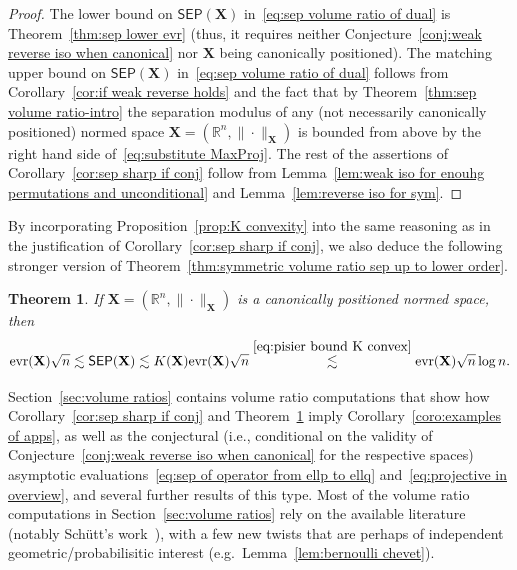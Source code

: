 \documentclass[11pt,reqno]{amsart}
\newcommand{\evr}{\mathrm{evr}}
\newcommand{\X}{\mathbf X}
\newcommand{\R}{\mathbb R}
\newtheorem{theorem}{Theorem}
\theoremstyle{remark}
\renewcommand{\1}{\mathbf 1}
\newcommand{\sep}{\mathsf{SEP}}
\begin{document}
\begin{proof} The lower bound on $\sep(\X)$ in~\eqref{eq:sep volume ratio of dual} is Theorem~\ref{thm:sep lower evr}  (thus, it requires neither Conjecture~\ref{conj:weak reverse iso when canonical} nor $\X$ being canonically positioned). The matching upper bound on $\sep(\X)$ in~\eqref{eq:sep volume ratio of dual} follows from Corollary~\ref{cor:if weak reverse holds} and the fact that by Theorem~\ref{thm:sep volume ratio-intro} the separation modulus of any (not necessarily canonically positioned) normed space $\X=(\R^n,\|\cdot\|_\X)$ is bounded from above by the right hand side of~\eqref{eq:substitute MaxProj}. The rest of the assertions of Corollary~\ref{cor:sep sharp if conj} follow from Lemma~\ref{lem:weak iso for enouhg permutations and unconditional} and Lemma~\ref{lem:reverse iso for sym}.
\end{proof}

By incorporating Proposition~\ref{prop:K convexity} into the same reasoning as in the  justification of Corollary~\ref{cor:sep sharp if conj}, we also deduce the following stronger version of Theorem~\ref{thm:symmetric volume ratio sep up to lower order}.

\begin{theorem}\label{thm:sharp up to log n canonically} If $\X=(\R^n,\|\cdot\|_\X)$ is a canonically positioned normed space, then $$\evr(\X)\sqrt{n} \lesssim \sep(\X)\lesssim K(\X)\evr(\X)\sqrt{n}\stackrel{\eqref{eq:pisier bound K convex}}{\lesssim} \evr(\X)\sqrt{n}\log n.$$
\end{theorem}


Section~\ref{sec:volume ratios} contains volume ratio computations that show how Corollary~\ref{cor:sep sharp if conj} and Theorem~\ref{thm:sharp up to log n canonically} imply Corollary~\ref{coro:examples of apps}, as well as the conjectural (i.e., conditional on the validity of Conjecture~\ref{conj:weak reverse iso when canonical}  for the respective spaces) asymptotic evaluations~\eqref{eq:sep of operator from ellp to ellq} and~\eqref{eq:projective in overview}, and several further results of this type. Most of the volume ratio computations in Section~\ref{sec:volume ratios} rely on the available literature (notably Sch\"utt's work~\cite{Sch82}), with a few new twists that are perhaps of independent geometric/probabilisitic interest (e.g.~Lemma~\ref{lem:bernoulli chevet}).
\end{document}
